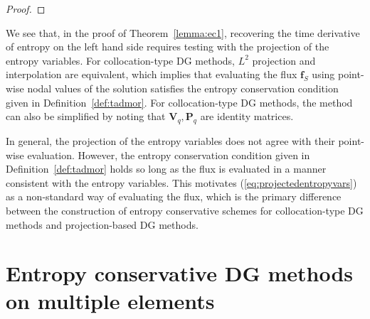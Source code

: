\documentclass[preprint,10pt]{article}
\theoremstyle{definition}
\theoremstyle{lemma}
\theoremstyle{theorem}
\theoremstyle{assumption}
\newcommand{\LRp}[1]{\left( #1 \right)}
\begin{document}
\begin{proof}
%
\end{proof}

We see that, in the proof of Theorem~\ref{lemma:ec1}, recovering the time derivative of entropy on the left hand side requires testing with the projection of the entropy variables.  For collocation-type DG methods, $L^2$ projection and interpolation are equivalent, which implies that evaluating the flux $\bm{f}_S$ using point-wise nodal values of the solution satisfies the entropy conservation condition given in Definition~\ref{def:tadmor}.  For collocation-type DG methods, the method can also be simplified by noting that $\bm{V}_q,\bm{P}_q$ are identity matrices.  

In general, the projection of the entropy variables does not agree with their point-wise evaluation.  However, the entropy conservation condition given in Definition~\ref{def:tadmor} holds so long as the flux is evaluated in a manner consistent with the entropy variables.  This motivates (\ref{eq:projectedentropyvars}) as a non-standard way of evaluating the flux, which is the primary difference between the construction of entropy conservative schemes for collocation-type DG methods and projection-based DG methods.  

\section{Entropy conservative DG methods on multiple elements}
\label{sec:ecdg2}
\end{document}
